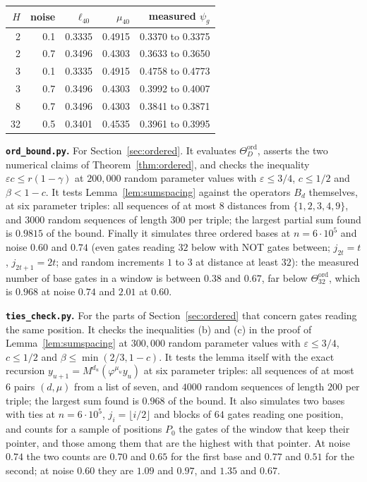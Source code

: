 \documentclass[11pt]{amsart}
\theoremstyle{definition}
\theoremstyle{remark}
\newcommand{\eps}{\varepsilon}
\begin{document}
\begin{center}
\begin{tabular}{rrrrr}
\toprule
$H$ & noise & $\ell_{40}$ & $\mu_{40}$ & measured $\psi_g$\\
\midrule
2 & 0.1 & 0.3335 & 0.4915 & 0.3370 to 0.3375\\
2 & 0.7 & 0.3496 & 0.4303 & 0.3633 to 0.3650\\
3 & 0.1 & 0.3335 & 0.4915 & 0.4758 to 0.4773\\
3 & 0.7 & 0.3496 & 0.4303 & 0.3992 to 0.4007\\
8 & 0.7 & 0.3496 & 0.4303 & 0.3841 to 0.3871\\
32 & 0.5 & 0.3401 & 0.4535 & 0.3961 to 0.3995\\
\bottomrule
\end{tabular}
\end{center}

\medskip\noindent\textbf{\texttt{ord\_bound.py}.} For Section~\ref{sec:ordered}. It evaluates
$\Theta^{\mathrm{ord}}_D$, asserts the two numerical claims of Theorem~\ref{thm:ordered}, and
checks the inequality $\eps c\le r(1-\gamma)$ at $200{,}000$ random parameter values with
$\eps\le3/4$, $c\le1/2$ and $\beta<1-c$. It tests Lemma~\ref{lem:sumspacing} against the
operators $B_d$ themselves, at six parameter triples: all sequences of at most $8$ distances from
$\{1,2,3,4,9\}$, and $3000$ random sequences of length $300$ per triple; the largest partial sum
found is $0.9815$ of the bound. Finally it simulates three ordered bases at $n=6\cdot10^5$ and
noise $0.60$ and $0.74$ (even gates reading $32$ below with NOT gates between; $j_{2t}=t$,
$j_{2t+1}=2t$; and random increments $1$ to $3$ at distance at least $32$): the measured number
of base gates in a window is between $0.38$ and $0.67$, far below $\Theta^{\mathrm{ord}}_{32}$,
which is $0.968$ at noise $0.74$ and $2.01$ at $0.60$.

\medskip\noindent\textbf{\texttt{ties\_check.py}.} For the parts of Section~\ref{sec:ordered}
that concern gates reading the same position. It checks the inequalities (b) and (c) in the proof
of Lemma~\ref{lem:sumspacing} at $300{,}000$ random parameter values with $\eps\le3/4$,
$c\le1/2$ and $\beta\le\min(2/3,1-c)$. It tests the lemma itself with the exact recursion
$y_{u+1}=M^{d_u}(\varphi^{\mu_u}y_u)$ at six parameter triples: all sequences of at most $6$ pairs
$(d,\mu)$ from a list of seven, and $4000$ random sequences of length $200$ per triple; the
largest sum found is $0.968$ of the bound. It also simulates two bases with ties at
$n=6\cdot10^5$, $j_i=\lfloor i/2\rfloor$ and blocks of $64$ gates reading one position, and
counts for a sample of positions $P_0$ the gates of the window that keep their pointer, and
those among them that are the highest with that pointer. At noise $0.74$ the two counts are
$0.70$ and $0.65$ for the first base and $0.77$ and $0.51$ for the second; at noise $0.60$ they
are $1.09$ and $0.97$, and $1.35$ and $0.67$.
\end{document}
